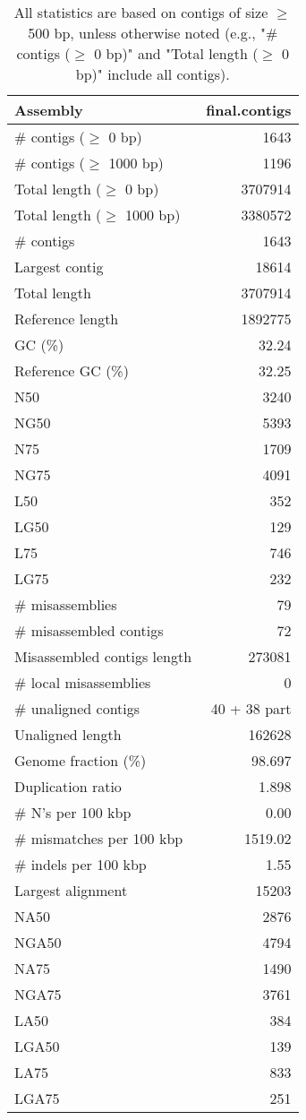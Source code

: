 \documentclass[12pt,a4paper]{article}
\begin{document}
\begin{table}[ht]
\begin{center}
\caption{All statistics are based on contigs of size $\geq$ 500 bp, unless otherwise noted (e.g., "\# contigs ($\geq$ 0 bp)" and "Total length ($\geq$ 0 bp)" include all contigs).}
\begin{tabular}{|l*{1}{|r}|}
\hline
Assembly & final.contigs \\ \hline
\# contigs ($\geq$ 0 bp) & 1643 \\ \hline
\# contigs ($\geq$ 1000 bp) & 1196 \\ \hline
Total length ($\geq$ 0 bp) & 3707914 \\ \hline
Total length ($\geq$ 1000 bp) & 3380572 \\ \hline
\# contigs & 1643 \\ \hline
Largest contig & 18614 \\ \hline
Total length & 3707914 \\ \hline
Reference length & 1892775 \\ \hline
GC (\%) & 32.24 \\ \hline
Reference GC (\%) & 32.25 \\ \hline
N50 & 3240 \\ \hline
NG50 & 5393 \\ \hline
N75 & 1709 \\ \hline
NG75 & 4091 \\ \hline
L50 & 352 \\ \hline
LG50 & 129 \\ \hline
L75 & 746 \\ \hline
LG75 & 232 \\ \hline
\# misassemblies & 79 \\ \hline
\# misassembled contigs & 72 \\ \hline
Misassembled contigs length & 273081 \\ \hline
\# local misassemblies & 0 \\ \hline
\# unaligned contigs & 40 + 38 part \\ \hline
Unaligned length & 162628 \\ \hline
Genome fraction (\%) & 98.697 \\ \hline
Duplication ratio & 1.898 \\ \hline
\# N's per 100 kbp & 0.00 \\ \hline
\# mismatches per 100 kbp & 1519.02 \\ \hline
\# indels per 100 kbp & 1.55 \\ \hline
Largest alignment & 15203 \\ \hline
NA50 & 2876 \\ \hline
NGA50 & 4794 \\ \hline
NA75 & 1490 \\ \hline
NGA75 & 3761 \\ \hline
LA50 & 384 \\ \hline
LGA50 & 139 \\ \hline
LA75 & 833 \\ \hline
LGA75 & 251 \\ \hline
\end{tabular}
\end{center}
\end{table}
\end{document}
